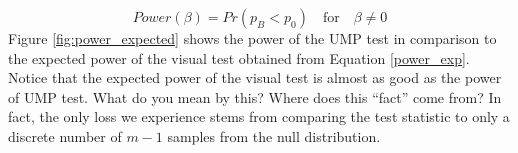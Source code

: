 \documentclass{article}
\newcommand{\green}[1]{{\color{green} #1}} %
\newtheorem{thm}{Theorem}[section]
\begin{document}
\begin{equation}\label{power_exp} 
   Power(\beta)=Pr(p_{B} < p_0)  \quad \text{for}  \quad \beta \ne 0
\end{equation}
Figure \ref{fig:power_expected} shows the power of the UMP test in comparison to the expected power of the visual test obtained from Equation \ref{power_exp}. Notice that the expected power of the visual test is almost as good as the power of UMP test. \green{What do you mean by this? Where does this ``fact'' come from?} In fact, the only loss we experience stems from comparing the test statistic to only a discrete number of  $m-1$ samples from the null distribution. 

% 
%
%
%
%
%
\end{document}
